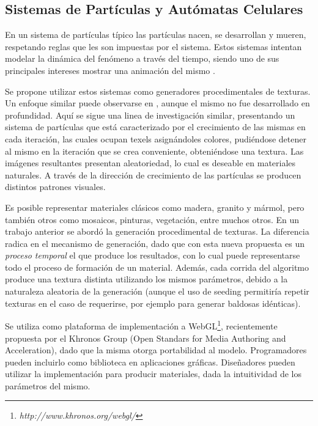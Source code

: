 \documentclass[spanish,a4paper,openright,11pt]{book}
\begin{document}

\subsection{Sistemas de Partículas y Autómatas Celulares}
En un sistema de part\'iculas t\'ipico las part\'iculas nacen, se desarrollan y mueren, respetando reglas que les son impuestas por el sistema. Estos sistemas intentan modelar la din\'amica del fen\'omeno a trav\'es del tiempo, siendo uno de sus principales intereses mostrar una animaci\'on del mismo \cite{Gao2010, Bagar2010, Lentine2010}.

Se propone utilizar estos sistemas como generadores procedimentales de texturas. Un enfoque similar puede observarse en \cite{Kranidotis98}, aunque el mismo no fue desarrollado en profundidad.
Aquí se sigue una linea de investigaci\'on similar, presentando un sistema de part\'iculas que est\'a caracterizado por el crecimiento de las mismas en cada iteraci\'on, las cuales ocupan texels asign\'andoles colores, pudi\'endose detener al mismo en la iteraci\'on que se crea conveniente, obteni\'endose una textura.
Las im\'agenes resultantes presentan aleatoriedad, lo cual es deseable en materiales naturales.
A trav\'es de la direcci\'on de crecimiento de las part\'iculas se producen distintos patrones visuales.

Es posible representar materiales cl\'asicos como madera, granito y m\'armol, pero tambi\'en otros como mosaicos, pinturas, vegetaci\'on, entre muchos otros.
En un trabajo anterior \cite{Baravalle2010} se abord\'o la generaci\'on procedimental de texturas.
La diferencia radica en el mecanismo de generaci\'on, dado que con esta nueva propuesta es un {\em proceso temporal} el que produce los resultados, con lo cual puede representarse todo el proceso de formaci\'on de un material.
Adem\'as, cada corrida del algoritmo produce una textura distinta utilizando los mismos par\'ametros, debido a la naturaleza aleatoria de la generaci\'on (aunque el uso de seeding permitir\'ia repetir texturas en el caso de requerirse, por ejemplo para generar baldosas id\'enticas).

Se utiliza como plataforma de implementaci\'on a WebGL\footnote{\em http://www.khronos.org/webgl/}, recientemente propuesta por el Khronos Group (Open Standars for Media Authoring and Acceleration), dado que la misma otorga portabilidad al modelo. 
Programadores pueden incluirlo como biblioteca en aplicaciones gr\'aficas.
Dise\~nadores pueden utilizar la implementaci\'on para producir materiales, dada la intuitividad de los par\'ametros del mismo.
\end{document}
